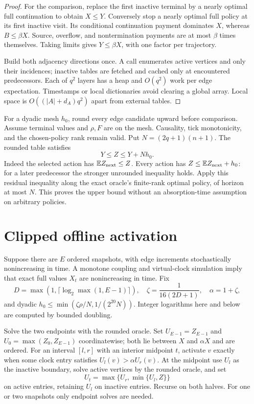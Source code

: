 \documentclass[acmsmall,11pt,screen,nonacm]{acmart}
\newcommand{\E}{\mathbb{E}}
\begin{document}
\begin{proof}
For the comparison, replace the first inactive terminal by a nearly optimal full continuation to obtain $X\le Y$. Conversely stop a nearly optimal full policy at its first inactive visit. Its conditional continuation payment dominates $X$, whereas $B\le\beta X$. Source, overflow, and nontermination payments are at most $\beta$ times themselves. Taking limits gives $Y\le\beta X$, with one factor per trajectory.

Build both adjacency directions once. A call enumerates active vertices and only their incidences; inactive tables are fetched and cached only at encountered predecessors. Each of $q^2$ layers has a heap and $O(q^2)$ work per edge expectation. Timestamps or local dictionaries avoid clearing a global array. Local space is $O((|A|+d_A)q^2)$ apart from external tables.
\end{proof}

For a dyadic mesh $h_0$, round every edge candidate upward before comparison. Assume terminal values and $\rho,F$ are on the mesh. Causality, tick monotonicity, and the chosen-policy rank remain valid. Put $N=(2q+1)(n+1)$. The rounded table satisfies
\begin{equation}\label{eq:round}
 Y\le Z\le Y+Nh_0.
\end{equation}
Indeed the selected action has $\E Z_{\rm next}\le Z$. Every action has $Z\le\E Z_{\rm next}+h_0$: for a later predecessor the stronger unrounded inequality holds. Apply this residual inequality along the exact oracle's finite-rank optimal policy, of horizon at most $N$. This proves the upper bound without an absorption-time assumption on arbitrary policies.

\section{Clipped offline activation}\label{sec:offline}
Suppose there are $E$ ordered snapshots, with edge increments stochastically nonincreasing in time. A monotone coupling and virtual-clock simulation imply that exact full values $X_t$ are nonincreasing in time. Fix
\[
 D=\max(1,\lceil\log_2\max(1,E-1)\rceil),\quad
 \zeta=\frac1{16(2D+1)},\quad \alpha=1+\zeta,
\]
and dyadic $h_0\le\min(\zeta\rho/N,1/(2^{20}N))$. Integer logarithms here and below are computed by bounded doubling.

Solve the two endpoints with the rounded oracle. Set $U_{E-1}=Z_{E-1}$ and $U_0=\max(Z_0,Z_{E-1})$ coordinatewise; both lie between $X$ and $\alpha X$ and are ordered. For an interval $[l,r]$ with an interior midpoint $t$, activate $v$ exactly when some clock entry satisfies $U_l(v)>\alpha U_r(v)$. At the midpoint use $U_l$ as the inactive boundary, solve active vertices by the rounded oracle, and set
\begin{equation}\label{eq:clip}
 U_t=\max\{U_r,\min\{U_l,Z\}\}
\end{equation}
on active entries, retaining $U_l$ on inactive entries. Recurse on both halves. For one or two snapshots only endpoint solves are needed.
\end{document}
